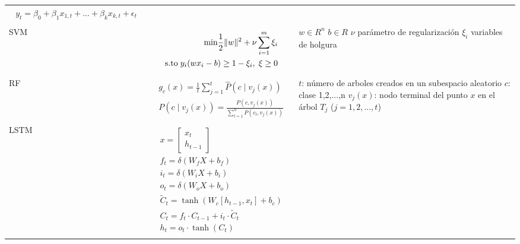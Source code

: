 \begin{table}
\begin{adjustbox}{width=0.95\textwidth}
\begin{tabular} {m{2cm} m{9cm} m{7cm}}
\begin{align}
\begin{split}
				y_{t} = \beta_{0}+\beta_{1}x_{1,t}+...+\beta_{k}x_{k,t}+\epsilon_{t}
			\end{split}
		\end{align}
		&
		\\
		SVM 		&	
		\begin{align}
			\label{eqn:6}
			\begin{split}
				\textrm{min} \frac{1}{2}\|w\|^{2}+\nu\sum_{i=1}^{m}\xi_{i}\\
				\textrm{s.to}\hspace{0.1cm} y_{i}(wx_{i}-b)\geq  1-\xi_{i},\hspace{0.1cm} \xi\geq 0
			\end{split}
		\end{align}
		&
		$w\in R^{n}$\newline
		$b\in R$\newline 
		$\nu$ parámetro de regularización \newline
		$\xi_{i}$ variables de holgura
		\\
		RF 		&	
		\begin{align}
			\label{eqn:8}
			\begin{split}
				g_{c}(x)=\frac{1}{t}\sum_{j=1}^{t}\hat{P}(c\mid v_{j}(x))\\
				P(c\mid v_{j}(x)) = \frac{P(c, v_{j}(x))}{\sum_{l=1}^{n}P(c_{l},v_{j}(x))}	
			\end{split}
		\end{align}
		&
		$t$: número de arboles creados en un subespacio aleatorio\newline
		$c$: clase 1,2,...,n\newline
		$v_{j}(x)$: nodo terminal del punto $x$ en el árbol $T_{j}$ ($j = 1,2,...,t$)
		\\
		LSTM 	&	
		\begin{align}
			\label{eqn:7}
			\begin{split}
				x = \left[ \begin{array}{c} x_{t} \\ h_{t-1} \end{array} \right]\\
				f_{t} = \delta(W_{f}X+b_{f})\\
				i_{t} = \delta(W_{i}X+b_{i})\\
				o_{t} = \delta(W_{o}X+b_{o})\\
				\tilde{C}_{t} = \tanh (W_{c}[h_{t-1},x_{t}]+b_{c})\\
				C_{t} = f_{t} \cdot C_{t-1}+i_{t} \cdot \tilde{C}_{t}\\
				h_{t} = o_{t}\cdot \tanh(C_{t})

\end{split}
\end{align}
\end{tabular}
\end{adjustbox}
\end{table}
